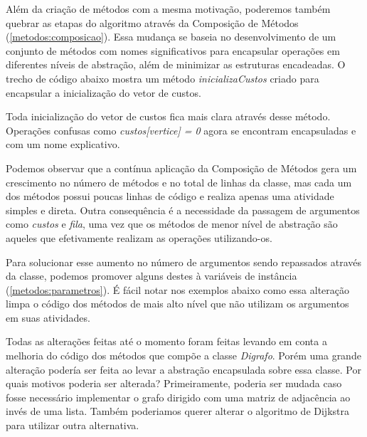 

Além da criação de métodos com a mesma motivação, poderemos também quebrar as etapas do algoritmo através da Composição 
de Métodos (\ref{metodos:composicao}). Essa mudança se baseia no desenvolvimento de um conjunto de métodos com nomes 
significativos para encapsular operações em diferentes níveis de abstração, além de minimizar as estruturas encadeadas.
O trecho de código abaixo mostra um método \textit{inicializaCustos} criado para encapsular a inicialização do vetor de 
custos.



Toda inicialização do vetor de custos fica mais clara através desse método. Operações confusas como 
\textit{custos[vertice] = 0} agora se encontram encapsuladas e com um nome explicativo.

Podemos observar que a contínua aplicação da Composição de Métodos gera um crescimento no número de métodos e no total de 
linhas da classe, mas cada um dos métodos possui poucas linhas de código e realiza apenas uma atividade simples e direta. 
Outra consequência é a necessidade da passagem de argumentos como \textit{custos} e \textit{fila}, uma vez que os métodos 
de menor nível de abstração são aqueles que efetivamente realizam as operações utilizando-os.

Para solucionar esse aumento no número de argumentos sendo repassados através da classe, podemos promover alguns destes à 
variáveis de instância (\ref{metodos:parametros}). É fácil notar nos exemplos abaixo como essa alteração limpa o código 
dos métodos de mais alto nível que não utilizam os argumentos em suas atividades.



Todas as alterações feitas até o momento foram feitas levando em conta a melhoria do código dos métodos que compõe a 
classe \textit{Digrafo}. Porém uma grande alteração podería ser feita ao levar a abstração encapsulada sobre essa classe.
Por quais motivos poderia ser alterada? Primeiramente, poderia ser mudada caso fosse necessário implementar o grafo 
dirigido com uma matriz de adjacência ao invés de uma lista. Também poderiamos querer alterar o algoritmo de Dijkstra 
para utilizar outra alternativa.

